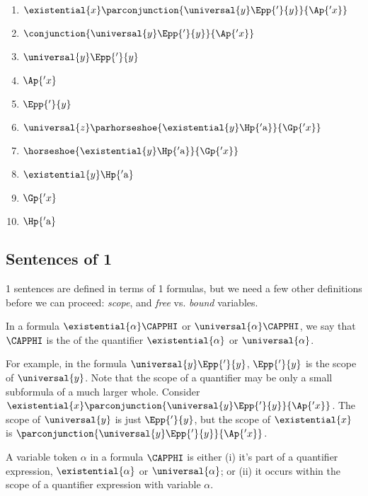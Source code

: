 \begin{majorILnc}{}
\begin{multicols}{2}
\begin{enumerate}[label=(\arabic*), leftmargin=1.85\parindent,
labelindent=.35\parindent, labelsep=*, itemsep=0pt, start=2]
\item $\existential{\variable{x}}\parconjunction{\universal{y}\Epp{'}{\variable{y}}}{\Ap{'\variable{x}}}$
\item $\conjunction{\universal{y}\Epp{'}{\variable{y}}}{\Ap{'\variable{x}}}$
\item $\universal{y}\Epp{'}{\variable{y}}$
\item $\Ap{'\variable{x}}$
\item $\Epp{'}{\variable{y}}$
\item $\universal{\variable{z}}\parhorseshoe{\existential{\variable{y}}\Hp{'\constant{a}}}{\Gp{'\variable{x}}}$
\item $\horseshoe{\existential{\variable{y}}\Hp{'\constant{a}}}{\Gp{'\variable{x}}}$
\item $\existential{\variable{y}}\Hp{'\constant{a}}$
\item $\Gp{'\variable{x}}$
\item $\Hp{'\constant{a}}$
\end{enumerate}
\end{multicols}
\end{majorILnc}

\subsection{Sentences of \GQL{}1}\label{Sentences of GQL1} 
\GQL{}1 sentences are defined in terms of \GQL{}1 formulas, but we need a few other definitions before we can proceed: \emph{scope}, and \emph{free} vs. \emph{bound} variables.

\begin{majorILnc}{}
	In a formula $\existential{\alpha}\CAPPHI$ or $\universal{\alpha}\CAPPHI$, we say that $\CAPPHI$ is the  of the quantifier $\existential{\alpha}$ or $\universal{\alpha}$. 
\end{majorILnc}
\noindent{}For example, in the formula $\universal{y}\Epp{'}{\variable{y}}$, $\Epp{'}{\variable{y}}$ is the scope of $\universal{y}$.
Note that the scope of a quantifier may be only a small subformula of a much larger whole.
Consider $\existential{\variable{x}}\parconjunction{\universal{y}\Epp{'}{\variable{y}}}{\Ap{'\variable{x}}}$.
The scope of $\universal{y}$ is just $\Epp{'}{\variable{y}}$, but the scope of $\existential{\variable{x}}$ is $\parconjunction{\universal{y}\Epp{'}{\variable{y}}}{\Ap{'\variable{x}}}$.

\begin{majorILnc}{}
	A variable token $\alpha$ in a formula $\CAPPHI$ is  \Iff either (i) it's part of a quantifier expression, $\existential{\alpha}$ or $\universal{\alpha}$; or (ii) it occurs within the scope of a quantifier expression with variable $\alpha$. 
\end{majorILnc}

